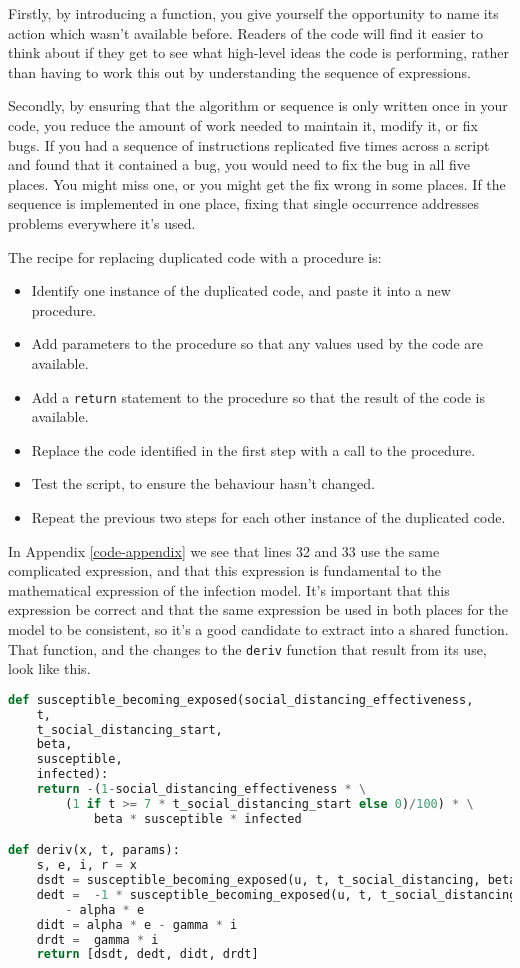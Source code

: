 \documentclass[a4paper]{article}
\begin{document}
Firstly, by introducing a function, you give yourself the opportunity to name its action which wasn't available before.
Readers of the code will find it easier to think about if they get to see what high-level ideas the code is performing, rather than having to work this out by understanding the sequence of expressions.

Secondly, by ensuring that the algorithm or sequence is only written once in your code, you reduce the amount of work needed to maintain it, modify it, or fix bugs.
If you had a sequence of instructions replicated five times across a script and found that it contained a bug, you would need to fix the bug in all five places.
You might miss one, or you might get the fix wrong in some places.
If the sequence is implemented in one place, fixing that single occurrence addresses problems everywhere it's used.

The recipe for replacing duplicated code with a procedure is:

\begin{itemize}
  \item Identify one instance of the duplicated code, and paste it into a new procedure.
  \item Add parameters to the procedure so that any values used by the code are available.
  \item Add a \texttt{return} statement to the procedure so that the result of the code is available.
  \item Replace the code identified in the first step with a call to the procedure.
  \item Test the script, to ensure the behaviour hasn't changed.
  \item Repeat the previous two steps for each other instance of the duplicated code.
\end{itemize}

In Appendix \ref{code-appendix} we see that lines 32 and 33 use the same complicated expression, and that this expression is fundamental to the mathematical expression of the infection model.
It's important that this expression be correct and that the same expression be used in both places for the model to be consistent, so it's a good candidate to extract into a shared function.
That function, and the changes to the \texttt{deriv} function that result from its use, look like this.

\begin{lstlisting}[language=Python]
def susceptible_becoming_exposed(social_distancing_effectiveness, 
    t,
    t_social_distancing_start,
    beta,
    susceptible,
    infected):
    return -(1-social_distancing_effectiveness * \
        (1 if t >= 7 * t_social_distancing_start else 0)/100) * \
            beta * susceptible * infected

def deriv(x, t, params):
    s, e, i, r = x
    dsdt = susceptible_becoming_exposed(u, t, t_social_distancing, beta, s, i)
    dedt =  -1 * susceptible_becoming_exposed(u, t, t_social_distancing, beta, s, i)\
        - alpha * e
    didt = alpha * e - gamma * i
    drdt =  gamma * i
    return [dsdt, dedt, didt, drdt]
\end{lstlisting}
\end{document}
